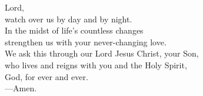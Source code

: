 \prayer


\begin{prayerverse}
Lord,\\
watch over us by day and by night.\\
In the midst of life’s countless changes\\
strengthen us with your never-changing love.\\
We ask this through our Lord Jesus Christ, your Son,\\
who lives and reigns with you and the Holy Spirit,\\
God, for ever and ever.\\
{\color{red}---\thinspace}Amen.
\end{prayerverse}

